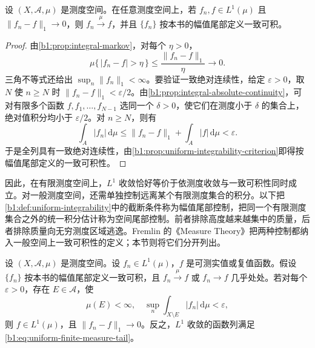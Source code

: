 \begin{proposition}
\label{b1:prop:l1-convergence-uniform-integrability}
设 \((X,\mathcal A,\mu)\) 是测度空间。在任意测度空间上，若 \(f_n,f\in L^1(\mu)\) 且 \(\|f_n-f\|_1\to0\)，则 \(f_n\xrightarrow{\mu}f\)，并且 \(\{f_n\}\) 按本书的幅值尾部定义一致可积。
\end{proposition}

\begin{proof}
由\cref{b1:prop:integral-markov}，对每个 \(\eta>0\)，
\[
\mu\{\,|f_n-f|>\eta\,\}
\leq\frac{\|f_n-f\|_1}{\eta}\longrightarrow0.
\]
三角不等式还给出 \(\sup_n\|f_n\|_1<\infty\)。要验证一致绝对连续性，给定 \(\varepsilon>0\)，取 \(N\) 使 \(n\geq N\) 时 \(\|f_n-f\|_1<\varepsilon/2\)。由\cref{b1:prop:integral-absolute-continuity}，可对有限多个函数 \(f,f_1,\ldots,f_{N-1}\) 选同一个 \(\delta>0\)，使它们在测度小于 \(\delta\) 的集合上，绝对值积分均小于 \(\varepsilon/2\)。对 \(n\geq N\)，则有
\[
\int_A|f_n|\,\mathrm d\mu
\leq\|f_n-f\|_1+\int_A|f|\,\mathrm d\mu<\varepsilon.
\]
于是全列具有一致绝对连续性，由\cref{b1:prop:uniform-integrability-criterion}即得按幅值尾部定义的一致可积性。
\end{proof}

因此，在有限测度空间上，\(L^1\) 收敛恰好等价于依测度收敛与一致可积性同时成立。对一般测度空间，还需单独控制远离某个有限测度集合的积分。以下把\cref{b1:def:uniform-integrability}中的截断条件称为幅值尾部控制，把同一个有限测度集合之外的统一积分估计称为空间尾部控制。前者排除高度越来越集中的质量，后者排除质量向无穷测度区域逃逸。Fremlin 的《Measure Theory》\cite[Volume 2, 246A, 246B, and 246J]{Fremlin2016Measure}把两种控制都纳入一般空间上一致可积性的定义；本节则将它们分开列出。

\begin{proposition}
\label{b1:prop:vitali-general-measure}
设 \((X,\mathcal A,\mu)\) 是测度空间。设 \(f_n\in L^1(\mu)\)，\(f\) 是可测实值或复值函数。假设 \(\{f_n\}\) 按本书的幅值尾部定义一致可积，且 \(f_n\xrightarrow{\mu}f\) 或 \(f_n\to f\) 几乎处处。若对每个 \(\varepsilon>0\)，存在 \(E\in\mathcal A\)，使
\begin{equation}
\label{b1:eq:uniform-finite-measure-tail}
\mu(E)<\infty,
\quad\sup_n\int_{X\setminus E}|f_n|\,\mathrm d\mu<\varepsilon,
\end{equation}
则 \(f\in L^1(\mu)\)，且 \(\|f_n-f\|_1\to0\)。反之，\(L^1\) 收敛的函数列满足\eqref{b1:eq:uniform-finite-measure-tail}。
\end{proposition}

